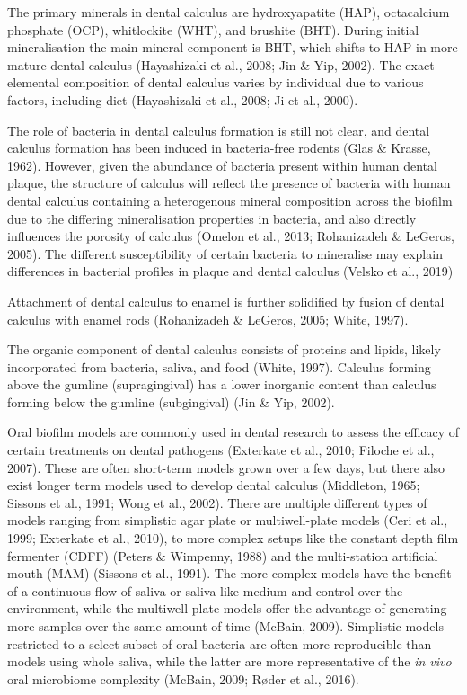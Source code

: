 \documentclass[
]{article}
\begin{document}
The primary minerals in dental calculus are hydroxyapatite (HAP),
octacalcium phosphate (OCP), whitlockite (WHT), and brushite (BHT).
During initial mineralisation the main mineral component is BHT, which
shifts to HAP in more mature dental calculus (Hayashizaki et al., 2008;
Jin \& Yip, 2002). The exact elemental composition of dental calculus
varies by individual due to various factors, including diet (Hayashizaki
et al., 2008; Ji et al., 2000).

The role of bacteria in dental calculus formation is still not clear,
and dental calculus formation has been induced in bacteria-free rodents
(Glas \& Krasse, 1962). However, given the abundance of bacteria present
within human dental plaque, the structure of calculus will reflect the
presence of bacteria with human dental calculus containing a
heterogenous mineral composition across the biofilm due to the differing
mineralisation properties in bacteria, and also directly influences the
porosity of calculus (Omelon et al., 2013; Rohanizadeh \& LeGeros,
2005). The different susceptibility of certain bacteria to mineralise
may explain differences in bacterial profiles in plaque and dental
calculus (Velsko et al., 2019)

Attachment of dental calculus to enamel is further solidified by fusion
of dental calculus with enamel rods (Rohanizadeh \& LeGeros, 2005;
White, 1997).

The organic component of dental calculus consists of proteins and
lipids, likely incorporated from bacteria, saliva, and food (White,
1997). Calculus forming above the gumline (supragingival) has a lower
inorganic content than calculus forming below the gumline (subgingival)
(Jin \& Yip, 2002).

Oral biofilm models are commonly used in dental research to assess the
efficacy of certain treatments on dental pathogens (Exterkate et al.,
2010; Filoche et al., 2007). These are often short-term models grown
over a few days, but there also exist longer term models used to develop
dental calculus (Middleton, 1965; Sissons et al., 1991; Wong et al.,
2002). There are multiple different types of models ranging from
simplistic agar plate or multiwell-plate models (Ceri et al., 1999;
Exterkate et al., 2010), to more complex setups like the constant depth
film fermenter (CDFF) (Peters \& Wimpenny, 1988) and the multi-station
artificial mouth (MAM) (Sissons et al., 1991). The more complex models
have the benefit of a continuous flow of saliva or saliva-like medium
and control over the environment, while the multiwell-plate models offer
the advantage of generating more samples over the same amount of time
(McBain, 2009). Simplistic models restricted to a select subset of oral
bacteria are often more reproducible than models using whole saliva,
while the latter are more representative of the \emph{in vivo} oral
microbiome complexity (McBain, 2009; Røder et al., 2016).
\end{document}
